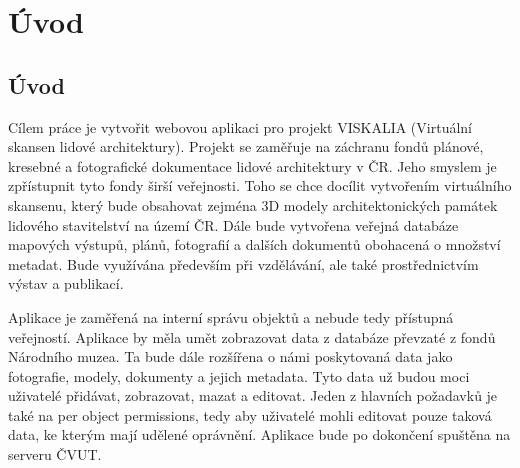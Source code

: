 \chapter*{Úvod}
\label{0-uvod}

\section{Úvod}

Cílem práce je vytvořit webovou aplikaci pro projekt VISKALIA (Virtuální skansen lidové architektury). Projekt se zaměřuje na záchranu fondů plánové, kresebné a fotografické dokumentace lidové architektury v ČR. Jeho smyslem je zpřístupnit tyto fondy širší veřejnosti. Toho se chce docílit vytvořením virtuálního skansenu, který bude obsahovat zejména 3D modely architektonických památek lidového stavitelství na území ČR. Dále bude vytvořena veřejná databáze mapových výstupů, plánů, fotografií a dalších dokumentů obohacená o množství metadat. Bude využívána především při vzdělávání, ale také prostřednictvím výstav a publikací.

Aplikace je zaměřená na interní správu objektů a nebude tedy přístupná veřejností. Aplikace by měla umět zobrazovat data z databáze převzaté z fondů Národního muzea. Ta bude dále rozšířena o námi poskytovaná data jako fotografie, modely, dokumenty a jejich metadata. Tyto data už budou moci uživatelé přidávat, zobrazovat, mazat a editovat. Jeden z hlavních požadavků je také na per object permissions, tedy aby uživatelé mohli editovat pouze taková data, ke kterým mají udělené oprávnění. Aplikace bude po dokončení spuštěna na serveru ČVUT.



